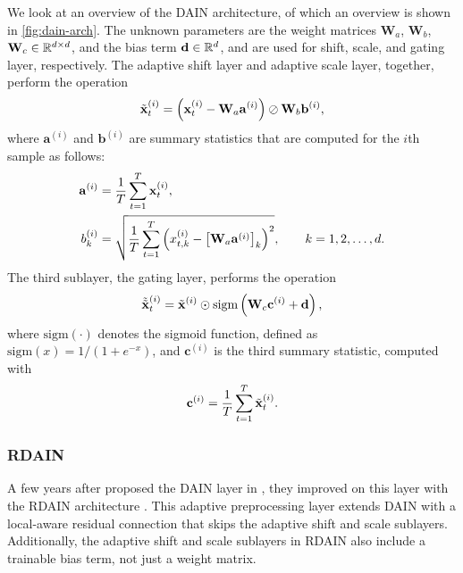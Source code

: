 \documentclass{statsmsc}
\begin{document}
{We look at an overview of the \ac{DAIN} architecture, of which an overview is shown
in \cref{fig:dain-arch}. The unknown parameters are the weight matrices
$\mathbf{W}_a$, $\mathbf{W}_b$, $\mathbf{W}_c \in \mathbb{R}^{d \times d}$, and the bias
term $\mathbf{d} \in \mathbb{R}^d$, and are used
for shift, scale, and gating layer, respectively. The adaptive shift layer and
adaptive scale layer, together, perform the operation
\begin{equation}\label{eq:dain_tild}
    \tilde{\mathbf{x}}_t^{(i)}=\left(
        \mathbf{x}_t^{(i)}-\mathbf{W}_a \mathbf{a}^{(i)}
    \right) \oslash \mathbf{W}_b \mathbf{b}^{(i)},
\end{equation}
where $\mathbf{a}^{(i)}$ and $\mathbf{b}^{(i)}$ are summary statistics that are computed for
the $i$th sample as follows:
\begin{align}
    \mathbf{a}^{(i)}& =\frac{1}{T} \sum^{T}_{t=1} \mathbf{x}_t^{(i)}, \label{eq:dain_a}\\
    b_k^{(i)}&=\sqrt{
    \frac{1}{T} \sum^{T}_{t=1} \left(x^{(i)}_{t,k} - \left[\mathbf{W}_a  \mathbf{a}^{(i)}\right]_k \right)^2},
    \qquad k=1,2,\dots,d. \label{eq:dain_b}
\end{align}
The third sublayer, the gating layer, performs the operation
\begin{equation}
    \tilde{\tilde{\mathbf{x}}}_t^{(i)}=\tilde{\mathbf{x}}^{(i)} \odot \textrm{sigm}\left( \mathbf{W}_c \mathbf{c}^{(i)} + \mathbf{d}\right),
\end{equation}
where $\textrm{sigm}(\cdot)$ denotes the sigmoid function, defined as
$\textrm{sigm}(x)=1/(1+e^{-x})$, and $\mathbf{c}^{(i)}$ is the third summary statistic, computed
with
\begin{equation}
    \mathbf{c}^{(i)}=\frac{1}{T} \sum^{T}_{t=1} \tilde{\mathbf{x}}_t^{(i)}.
\end{equation}


\subsubsection{RDAIN}%
\label{ssub:RDAIN}

A few years after \citeauthor{dain} proposed the \ac{DAIN} layer in \citeyear{dain}, they
improved on
this layer with the \ac{RDAIN} architecture \citep{rdain}. This adaptive preprocessing layer
extends \ac{DAIN} with a local-aware residual connection that skips the adaptive shift and
scale sublayers. Additionally, the adaptive shift and scale sublayers in \ac{RDAIN} also
include a trainable bias term, not just a weight matrix.

}
\end{document}
